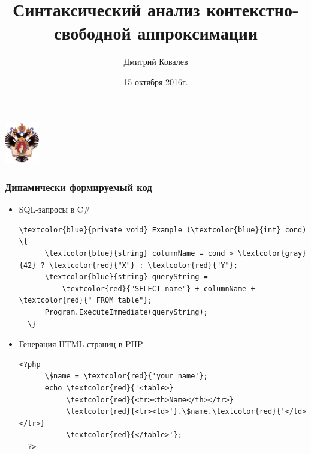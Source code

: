 \documentclass{beamer}
\title[]{Синтаксический анализ контекстно-свободной аппроксимации}
\subtitle[]{}
\institute[]{}
\author[Дмитрий Ковалев]{Дмитрий Ковалев}
\date{15 октября 2016г.}
\begin{document}
{

\begin{frame}
\begin{center}
	{\includegraphics[width=1.5cm]{pictures/SPbGU_Logo.png}}
\end{center}
\titlepage
\end{frame}
}


\begin{frame}[fragile]
	\transwipe[direction=90]
	\frametitle{Динамически формируемый код}  
	\begin{itemize}
		\item SQL-запросы в C$\#$    
			\begin{Verbatim}[commandchars=\\\{\}]
  \textcolor{blue}{private void} Example (\textcolor{blue}{int} cond) \{
      \textcolor{blue}{string} columnName = cond > \textcolor{gray}{42} ? \textcolor{red}{"X"} : \textcolor{red}{"Y"};
      \textcolor{blue}{string} queryString = 
          \textcolor{red}{"SELECT name"} + columnName + \textcolor{red}{" FROM table"};
      Program.ExecuteImmediate(queryString);
  \}
				\end{Verbatim}
		\pause
		\item Генерация HTML-страниц в PHP
			\begin{Verbatim}[commandchars=\\\{\}]	
  <?php 
      \$name = \textcolor{red}{'your name'};
      echo \textcolor{red}{'<table>} 
           \textcolor{red}{<tr><th>Name</th></tr>}  
           \textcolor{red}{<tr><td>'}.\$name.\textcolor{red}{'</td></tr>} 
           \textcolor{red}{</table>'};
  ?>
			\end{Verbatim}
	\end{itemize}
\end{frame}
\end{document}
